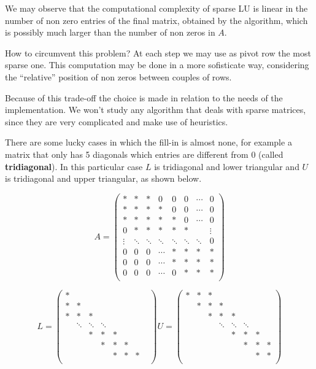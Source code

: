 \documentclass[computational_mathematics.tex]{subfiles}
\begin{document}
We may observe that the computational complexity of sparse LU is linear in the number of non zero entries of the final matrix, obtained by the algorithm, which is possibly much larger than the number of non zeros in $A$.

How to circumvent this problem? At each step we may use as pivot row the most sparse one. This computation may be done in a more sofisticate way, considering the ``relative'' position of non zeros between couples of rows.

Because of this trade-off the choice is made in relation to the needs of the implementation. We won't study any algorithm that deals with sparse matrices, since they are very complicated and make use of heuristics.

There are some lucky cases in which the fill-in is almost none, for example a matrix that only has 5 diagonals which entries are different from $0$ (called \textbf{tridiagonal}). In this particular case $L$ is tridiagonal and lower triangular and $U$ is tridiagonal and upper triangular, as shown below.

\[
A = \begin{pmatrix}
  \ast & \ast & \ast & 0 & 0 & 0  &\cdots & 0\\
  \ast & \ast & \ast & \ast & 0 & 0 & \cdots & 0\\
  \ast & \ast & \ast & \ast & \ast & 0 & \cdots & 0\\
  0 & \ast & \ast & \ast & \ast & \ast & & \vdots\\
  \vdots & \ddots & \ddots & \ddots & \ddots & \ddots & \ddots & 0\\
  0 & 0 & 0 & \cdots & \ast & \ast & \ast & \ast\\
  0 & 0 & 0 & \cdots & \ast & \ast & \ast & \ast\\
  0 & 0 & 0 & \cdots & 0 & \ast & \ast & \ast\\

\end{pmatrix}
\]

\[
L = \begin{pmatrix}
  \ast & & & & & & & \\
  \ast & \ast & & & & & \\
  \ast & \ast & \ast & & & & & \\
  & \ddots & \ddots & \ddots & & & \\
  & & \ast & \ast & \ast & & \\
  & & & \ast & \ast & \ast & \\
  & & & & \ast & \ast & \ast\\
\end{pmatrix}
U = \begin{pmatrix}
  \ast & \ast & \ast & & & & & \\
  & \ast & \ast & \ast & & & \\
  & & \ast & \ast & \ast & & & \\
  & & & \ddots & \ddots & \ddots & \\
  & & & & \ast & \ast & \ast & \\
  & & & & & \ast & \ast & \ast\\
  & & & & & & \ast & \ast\\
\end{pmatrix}
\]
\end{document}
